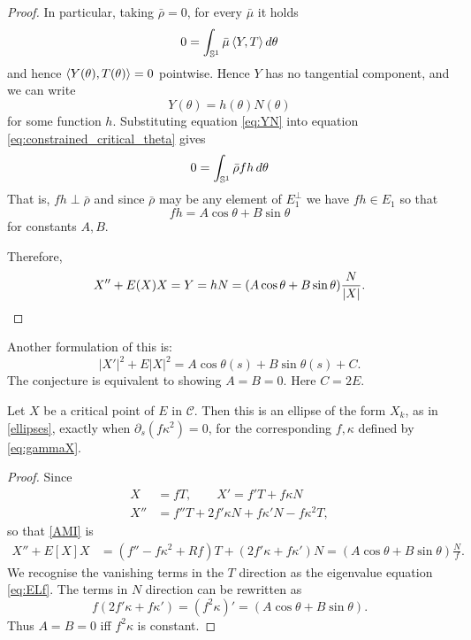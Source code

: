 \begin{proof}
In particular, taking \(\bar{\rho} = 0\),  for every \(\bar{\mu}\) it holds
\[
0 = \int_{\operatorname{\mathbb{S}^1}} \bar{\mu} \left\langle{Y},{T}\right\rangle  d\theta
\]
and hence \(\left\langle{Y(\theta)},{T(\theta)}\right\rangle = 0\) pointwise.  Hence $Y$ has no tangential component, and we can write
\begin{equation}
\label{eq:YN}
Y(\theta) = h(\theta) N(\theta) %
\end{equation}
for some function \(h\). Substituting equation \eqref{eq:YN} into equation \eqref{eq:constrained_critical_theta} gives
\[
0 =%
\int_{\So}\bar{\rho}f h \,d\theta
\]
That is, \(fh \perp \bar{\rho}\) and since \(\bar{\rho}\) may be any element of \(E_1^{\perp}\) we have \(fh \in E_1\) so that
\[
fh = A \cos\theta + B \sin\theta
\]
for constants \(A, B\).

Therefore,
\[
X'' + E(X) X = Y = hN %
= (A \cos\theta + B \sin\theta) \frac{N}{\abs{X}}.
\]
\end{proof}


\begin{rem}  \label{remark}
Another formulation of this %
 is:
$$ |X'|^2  + E|X|^2= A \cos \theta(s) + B\sin\theta(s) + C.$$
The conjecture is equivalent to showing $A=B=0$.   Here $C=2E$.
\end{rem}


\begin{lem} Let $X$ be a critical point of $E$ in $\mathcal{C}$.  Then this is an ellipse of the form $X_k$, as in \eqref{ellipses}, exactly when $\partial_s(f\kappa^2)=0$, for the corresponding $f,\kappa$ defined by \eqref{eq:gammaX}.      \label{ellipse lemma}
\end{lem}

\begin{proof}
Since 
\begin{align*}
X&=f T, \qquad
X'=f'T+f\kappa N \\
 X''& = f''T + 2f'\kappa N+ f\kappa' N - f\kappa^2 T,
 \end{align*}
so that \eqref{AMI} is 
\begin{align*}
X''+ E[X] X&= (f''-f\kappa^2 + R f      )T + (2f'\kappa+ f\kappa')N = (A\cos\theta + B\sin\theta)\frac{ N}f.
\end{align*}
We recognise the vanishing terms in the $T$ direction as the eigenvalue equation \eqref{eq:ELf}.  The terms in $N$ direction can be rewritten as
$$ f(2f'\kappa+ f\kappa')= \left( f^2\kappa\right)'=   (A\cos\theta + B\sin\theta).$$
Thus  $A=B=0$ iff $f^2\kappa$ is constant.   

\end{proof}
